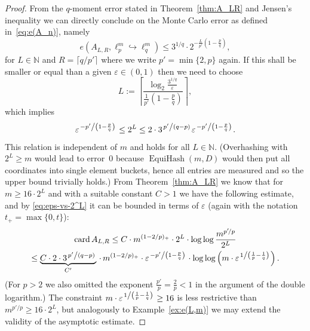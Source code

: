 \documentclass[12pt]{article}
\theoremstyle{plain}
\theoremstyle{definition}
\DeclareMathOperator{\EquiHash}{EquiHash}
\DeclareMathOperator{\card}{card}
\newcommand{\eps}{\varepsilon}
\newcommand{\embed}{\hookrightarrow}
\newcommand{\N}{{\mathbb N}}
\begin{document}
\begin{proof}
    From the $q$-moment error stated in Theorem~\ref{thm:A_LR} and Jensen's inequality we can directly conclude
    on the Monte Carlo error as defined in~\eqref{eq:e(A_n)}, namely
    \begin{equation*}
        e(A_{L,R}, \ell_p^m \embed \ell_q^m)
            \leq 3^{1/q} \cdot 2^{- \frac{L}{p'} \left(1 - \frac{p}{q}\right)},
    \end{equation*}
    for $L \in \N$ and $R = \lceil q/p' \rceil$ where we write $p' = \min\{2,p\}$ again.
    If this shall be smaller or equal than a given $\eps \in (0,1)$ then we need to choose
    \begin{equation*}
        L := \left\lceil \frac{\log_2 \frac{3^{1/q}}{\eps}}{\frac{1}{p'} \left(1 - \frac{p}{q}\right)} \right\rceil ,
    \end{equation*}
    which implies
    \begin{equation} \label{eq:eps-vs-2^L}
        \eps^{\left. -p' \middle/ \left(1 - \frac{p}{q}\right) \right.}
            \leq 2^L
            \leq 2 \cdot 3^{\left. p' \middle/ \left(q - p\right) \right.}
                    \eps^{\left. - p' \middle/ \left(1 - \frac{p}{q}\right) \right.} .
    \end{equation}
    This relation is independent of $m$ and holds for all $L \in \N$.
    (Overhashing with \mbox{$2^L \geq m$} would lead to error~$0$ because $\EquiHash(m,D)$ would then put all coordinates into single element buckets,
    hence all entries are measured and so the upper bound trivially holds.)
    From Theorem~\ref{thm:A_LR} we know that for $m \geq 16 \cdot 2^L$ and with a suitable constant $C > 1$ we have
    the following estimate, and by \eqref{eq:eps-vs-2^L} it can be bounded in terms of $\eps$
    (again with the notation $t_+ = \max\{0,t\}$):
    \begin{multline*}
        \card A_{L,R}
            \leq C \cdot m^{(1-2/p)_+} \cdot 2^L \cdot \log \log \frac{m^{p'\!/p}}{2^L} \\
            \leq \underbrace{C \cdot 2 \cdot 3^{\left. p' \middle/ \left(q-p\right) \right.}}_{C'}
                    \,\cdot\,m^{(1-2/p)_+} \cdot \eps^{\left. -p' \middle/ \left(1 - \frac{p}{q}\right) \right.}
                    \cdot \log \log \left(m\cdot \eps^{\left. 1 \middle/ \left(\frac{1}{p} - \frac{1}{q}\right) \right.}
                                    \right) .
    \end{multline*}
    (For $p > 2$ we also omitted the exponent $\frac{p'}{p} = \frac{2}{p} < 1$ in the argument of the double logarithm.)
    The constraint $m \cdot \eps^{\left. 1 \middle/ \left(\frac{1}{p} - \frac{1}{q}\right) \right.} \geq 16$
    is less restrictive than $m^{p'\!/p} \geq 16 \cdot 2^L$,
    but analogously to Example~\ref{ex:e(L,m)} we may extend the validity of the asymptotic estimate.


\end{proof}
\end{document}
